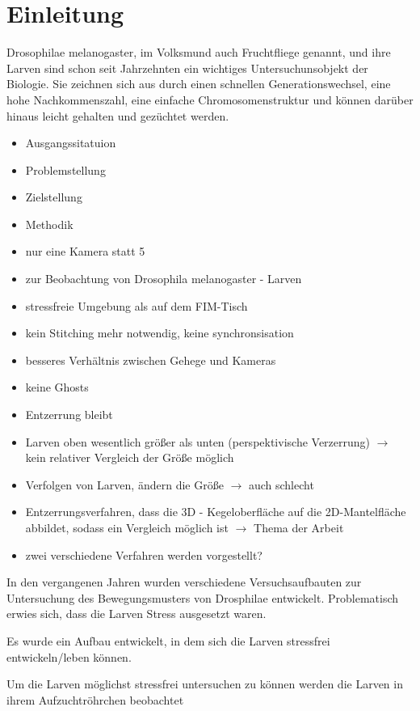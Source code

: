 \chapter{Einleitung}

Drosophilae melanogaster, im Volksmund auch Fruchtfliege genannt, und ihre Larven sind schon seit Jahrzehnten ein wichtiges Untersuchunsobjekt der Biologie. Sie zeichnen sich aus durch einen schnellen Generationswechsel, eine hohe Nachkommenszahl, eine einfache Chromosomenstruktur und können darüber hinaus leicht gehalten und gezüchtet werden.


\begin{itemize}
	\item Ausgangssitatuion
	\item Problemstellung
	\item Zielstellung
	\item Methodik
	\item nur eine Kamera statt 5
	\item zur Beobachtung von Drosophila melanogaster - Larven
	\item stressfreie Umgebung als auf dem FIM-Tisch
	\item kein Stitching mehr notwendig, keine synchronsisation
	\item besseres Verhältnis zwischen Gehege und Kameras
	\item keine Ghosts
	\item Entzerrung bleibt
	\item Larven oben wesentlich größer als unten (perspektivische Verzerrung) $\rightarrow$ kein relativer Vergleich der Größe möglich
	\item Verfolgen von Larven, ändern die Größe $\rightarrow$ auch schlecht
	\item Entzerrungsverfahren, dass die 3D - Kegeloberfläche auf die 2D-Mantelfläche abbildet, sodass ein Vergleich möglich ist $\rightarrow$ Thema der Arbeit
	\item zwei verschiedene Verfahren werden vorgestellt?
\end{itemize}

In den vergangenen Jahren wurden verschiedene Versuchsaufbauten zur Untersuchung des Bewegungsmusters von Drosphilae entwickelt. 
Problematisch erwies sich, dass die Larven Stress ausgesetzt waren.

Es wurde ein Aufbau entwickelt, in dem sich die Larven stressfrei entwickeln/leben können.

Um die Larven möglichst stressfrei untersuchen zu können werden die Larven in ihrem Aufzuchtröhrchen beobachtet

